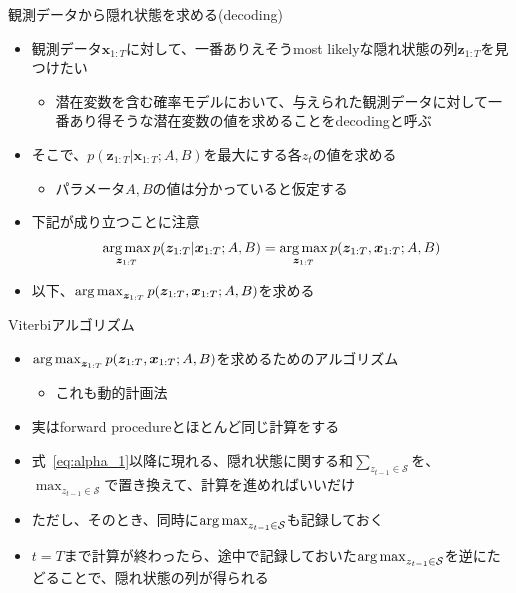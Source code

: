 \documentclass[aspectratio=169,unicode,dvipdfmx,14pt]{beamer}
\begin{document}
\begin{frame}{観測データから隠れ状態を求める(decoding)}
\begin{itemize}
\item 観測データ$\bm{x}_{1:T}$に対して、一番ありえそうmost likelyな隠れ状態の列$\bm{z}_{1:T}$を見つけたい
\begin{itemize}
\item 潜在変数を含む確率モデルにおいて、与えられた観測データに対して一番あり得そうな潜在変数の値を求めることをdecodingと呼ぶ
\end{itemize}
\item そこで、$p(\bm{z}_{1:T}|\bm{x}_{1:T}; A,B)$を最大にする各$z_t$の値を求める
\begin{itemize}
\item パラメータ$A, B$の値は分かっていると仮定する
\end{itemize}
\item 下記が成り立つことに注意
\begin{align}
\operatorname*{arg\,max}_{\bm{z}_{1:T}} p(\bm{z}_{1:T}|\bm{x}_{1:T}; A,B) = 
\operatorname*{arg\,max}_{\bm{z}_{1:T}} p(\bm{z}_{1:T}, \bm{x}_{1:T}; A,B)
\notag
\end{align}
\item 以下、$\operatorname*{arg\,max}_{\bm{z}_{1:T}} p(\bm{z}_{1:T}, \bm{x}_{1:T}; A,B)$を求める
\end{itemize}
\end{frame}


\begin{frame}{Viterbiアルゴリズム}
\begin{itemize}
\item $\operatorname*{arg\,max}_{\bm{z}_{1:T}} p(\bm{z}_{1:T}, \bm{x}_{1:T}; A,B)$を求めるためのアルゴリズム
\begin{itemize}
\item これも動的計画法
\end{itemize}
\item 実はforward procedureとほとんど同じ計算をする
\item 式~\eqref{eq:alpha_1}以降に現れる、隠れ状態に関する和$\sum_{z_{t-1} \in \mathcal{S}}$を、
$\max_{z_{t-1} \in \mathcal{S}}$で置き換えて、計算を進めればいいだけ
\item ただし、そのとき、同時に$\operatorname*{arg\,max}_{z_{t-1} \in \mathcal{S}}$も記録しておく
\item $t=T$まで計算が終わったら、途中で記録しておいた$\operatorname*{arg\,max}_{z_{t-1} \in \mathcal{S}}$を逆にたどることで、隠れ状態の列が得られる
\end{itemize}
\end{frame}
\end{document}
